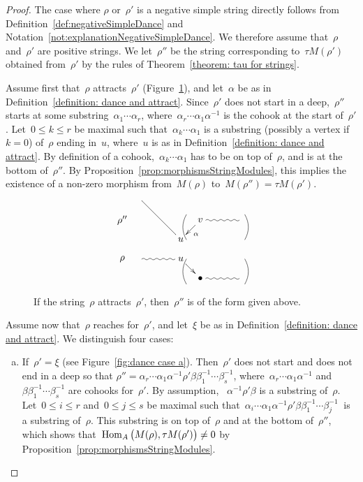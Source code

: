 \documentclass{amsart}
\theoremstyle{definition}
\newcommand{\Hom}[1]{\operatorname{{\rm Hom}}_{#1}}
\begin{document}
\begin{proof}
The case where $\rho$ or~$\rho'$ is a negative simple string directly follows from Definition~\ref{def:negativeSimpleDance} and Notation~\ref{not:explanationNegativeSimpleDance}.
We therefore assume that~$\rho$ and~$\rho'$ are positive strings.
We let~$\rho''$ be the string corresponding to~$\tau M(\rho')$ obtained from~$\rho'$ by the rules of Theorem~\ref{theorem: tau for strings}.

Assume first that~$\rho$ attracts~$\rho'$ (Figure~\ref{fig:rho attracts rho'}), and let~$\alpha$ be as in Definition~\ref{definition: dance and attract}.
Since~$\rho'$ does not start in a deep,~$\rho''$ starts at some substring~$\alpha_1\cdots\alpha_r$, where~$\alpha_r\cdots\alpha_1\alpha^{-1}$ is the cohook at the start of~$\rho'$.
Let~$0\leq k\leq r$ be maximal such that~$\alpha_k\cdots\alpha_1$ is a substring (possibly a vertex if $k=0$) of~$\rho$ ending in~$u$, where~$u$ is as in Definition~\ref{definition: dance and attract}.
By definition of a cohook,~$\alpha_k\cdots\alpha_1$ has to be on top of~$\rho$, and is at the bottom of~$\rho''$.
By Proposition~\ref{prop:morphismsStringModules}, this implies the existence of a non-zero morphism from~$M(\rho)$ to~$M(\rho'') = \tau M(\rho')$.

\begin{figure}[h]
\[
\xy
%
(7,14)="peak";
%
(0,7)*+{\rho''}="10";
(28,7)*+{v}="14";
(42,7)="16";
%
(21,0)*+{u}="3";
%
(0,-7)*+{\rho}="-0";
(7,-7)="-1";
(21,-7)*+{u}="-3";
%
(28,-14)*+{\bullet}="-14";
(42,-14)="-16";
%
{\ar@{~} "-1";"-3"};
{\ar "-3";"-14"};
{\ar@{~} "-14";"-16"};
%
{\ar@{~} "14";"16"};
%
{\ar^{\alpha} "14";"3"};
{\ar@{-} "peak";"3"};
%
{\ar@/_.3pc/@{-} (23,9);(23,0)};
{\ar@/^.3pc/@{-} (44,9);(44,0)};
%
{\ar@/_.3pc/@{-} (23,-7);(23,-16)};
{\ar@/^.3pc/@{-} (44,-7);(44,-16)};
%
\endxy
\]
    \caption{If the string~$\rho$ attracts~$\rho'$, then~$\rho''$ is of the form given above.}
    \vspace{-.5cm}
    \label{fig:rho attracts rho'}
\end{figure}

Assume now that~$\rho$ reaches for~$\rho'$, and let~$\xi$ be as in Definition~\ref{definition: dance and attract}.
We distinguish four cases:

\begin{enumerate}[(a)]
\item If~$\rho'=\xi$ (see Figure~\ref{fig:dance case a}). Then~$\rho'$ does not start and does not end in a deep so that ${\rho''= \alpha_r\cdots\alpha_1\alpha^{-1}\rho'\beta\beta_1^{-1}\cdots\beta_s^{-1}}$, where~$\alpha_r\cdots\alpha_1\alpha^{-1}$ and~$\beta\beta_1^{-1}\cdots\beta_s^{-1}$ are cohooks for~$\rho'$.
 By assumption, ~$\alpha^{-1}\rho'\beta$ is a substring of~$\rho$. Let~$0\leq i\leq r$ and~$0\leq j\leq s$ be maximal such that~$\alpha_i\cdots\alpha_1\alpha^{-1}\rho'\beta\beta_1^{-1}\cdots\beta_j^{-1}~$ is a substring of~$\rho$.
 This substring is on top of~$\rho$ and at the bottom of~$\rho''$, which shows that~$\Hom{A} \big( M(\rho), \tau M(\rho') \big) \ne 0$ by Proposition~\ref{prop:morphismsStringModules}.


\end{enumerate}
\end{proof}
\end{document}
